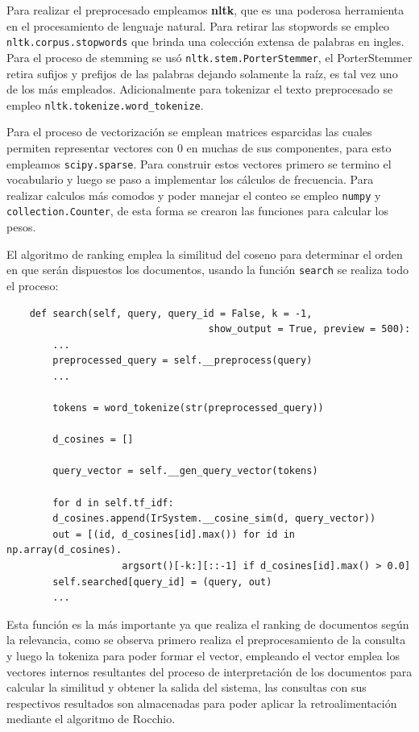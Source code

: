 \documentclass[runningheads,a4paper]{llncs}
\begin{document}
Para realizar el preprocesado empleamos \textbf{nltk}, que es una poderosa herramienta en el procesamiento de lenguaje natural. Para retirar las stopwords se empleo \verb*|nltk.corpus.stopwords| que brinda una colección extensa de palabras en ingles. Para el proceso de stemming se usó \verb*|nltk.stem.PorterStemmer|, el PorterStemmer retira sufijos y prefijos de las palabras dejando solamente la raíz, es tal vez uno de los más empleados. Adicionalmente para tokenizar el texto preprocesado se empleo \verb*|nltk.tokenize.word_tokenize|.

Para el proceso de vectorización se emplean matrices esparcidas las cuales permiten representar vectores con 0 en muchas de sus componentes, para esto empleamos \verb*|scipy.sparse|. Para construir estos vectores primero se termino el vocabulario y luego se paso a implementar los cálculos de frecuencia. Para realizar calculos más comodos y poder manejar el conteo se empleo \verb*|numpy| y \verb*|collection.Counter|, de esta forma se crearon las funciones para calcular los pesos.

El algoritmo de ranking emplea la similitud del coseno para determinar el orden en que serán dispuestos los documentos, usando la función \verb*|search| se realiza todo el proceso:

\noindent
%
\begin{verbatim}
	def search(self, query, query_id = False, k = -1, 
	                               show_output = True, preview = 500):
	    ...
	    preprocessed_query = self.__preprocess(query)
	    ...
	    
	    tokens = word_tokenize(str(preprocessed_query))
	    
	    d_cosines = []
	    
	    query_vector = self.__gen_query_vector(tokens)
	    
	    for d in self.tf_idf:
	    d_cosines.append(IrSystem.__cosine_sim(d, query_vector))	    
	    out = [(id, d_cosines[id].max()) for id in np.array(d_cosines).
	                argsort()[-k:][::-1] if d_cosines[id].max() > 0.0]	    
	    self.searched[query_id] = (query, out)
	    ...
\end{verbatim}
%
\noindent

Esta función es la más importante ya que realiza el ranking de documentos según la relevancia, como se observa primero realiza el preprocesamiento de la consulta y luego la tokeniza para poder formar el vector, empleando el vector emplea los vectores internos resultantes del proceso de interpretación de los documentos para calcular la similitud y obtener la salida del sistema, las consultas con sus respectivos resultados son almacenadas para poder aplicar la retroalimentación mediante el algoritmo de Rocchio.
\end{document}
